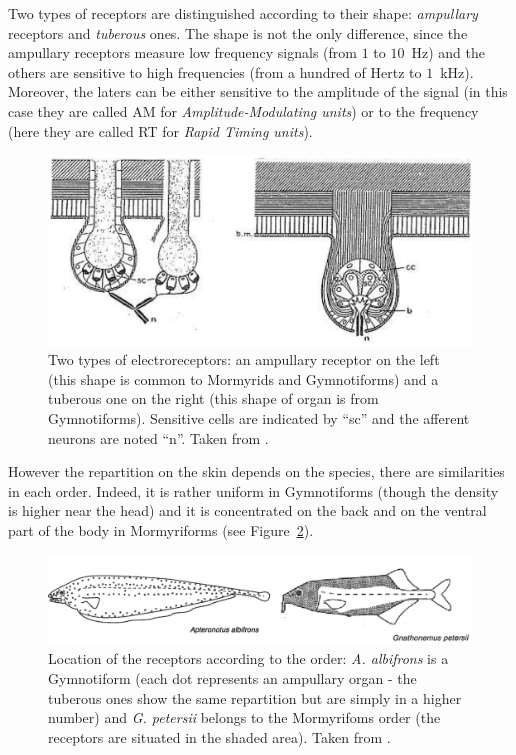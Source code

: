 Two types of receptors are distinguished according to their shape:
\emph{ampullary} receptors and \emph{tuberous} ones. The shape is
not the only difference, since the ampullary receptors measure low
frequency signals (from $1$ to $10$~Hz) and the others are sensitive
to high frequencies (from a hundred of Hertz to $1$~kHz). Moreover,
the laters can be either sensitive to the amplitude of the signal
(in this case they are called AM for \emph{Amplitude-Modulating units})
or to the frequency (here they are called RT for \emph{Rapid Timing
units}).

\begin{figure}[h]
\centering
\includegraphics[width=13cm]{intro/figures/electroreceptors}
\caption{Two types of electroreceptors: an ampullary receptor on the left (this shape is common to Mormyrids and Gymnotiforms) and a tuberous one on the right (this shape of organ is from Gymnotiforms). Sensitive cells are indicated by {}``sc'' and the afferent neurons are noted {}``n''. Taken from \cite{moller1995electric}. \label{fig:electroreceptor}}
\end{figure}

However the repartition on the skin depends on the species, there
are similarities in each order. Indeed, it is rather uniform in Gymnotiforms
(though the density is higher near the head) and it is concentrated
on the back and on the ventral part of the body in Mormyriforms (see
Figure~\ref{fig:density_electroreceptor}).

\begin{figure}[h]
\centering
\includegraphics[width=13cm]{intro/figures/density_electroreceptors}
\caption{Location of the receptors according to the order: \emph{A. albifrons} is a Gymnotiform (each dot represents an ampullary organ - the tuberous ones show the same repartition but are simply in a higher number) and \emph{G. petersii} belongs to the Mormyrifoms order (the receptors are situated in the shaded area). Taken from \cite{moller1995electric}. \label{fig:density_electroreceptor}}
\end{figure}




